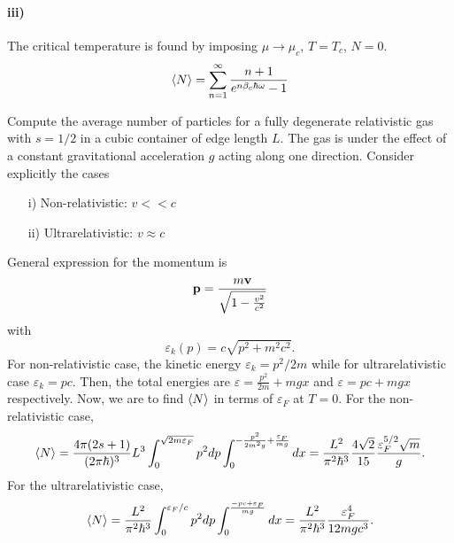             \paragraph{iii)} The critical temperature is found by imposing $\mu\to\mu_c$, $T=T_c$, $N=0$.
            \begin{equation}
                \langle N \rangle = \sum_{n=1}^{\infty}\frac{n+1}{e^{n\beta_c\hbar\omega}-1}
            \end{equation}
\newpage
        \begin{eocproblem*}{}
            Compute the average number of particles for a fully degenerate relativistic gas with $s=1/2$ in a cubic container of edge length $L$. The gas is under the effect of a constant gravitational acceleration $g$ acting along one direction. Consider explicitly the cases
            \begin{enumerate}
                \item[i)] Non-relativistic: $v<<c$
                \item[ii)] Ultrarelativistic: $v\approx c$ 
            \end{enumerate}
        \end{eocproblem*}
            General expression for the momentum is
            \begin{equation}
                \mathbf{p} = \frac{m\mathbf{v}}{\sqrt{1-\frac{v^2}{c^2}}}
            \end{equation}
            with
            \begin{equation}
                \varepsilon_k(p) = c\sqrt{p^2+m^2c^2}.
            \end{equation}
            For non-relativistic case, the kinetic energy $\varepsilon_k = p^2/2m$ while for ultrarelativistic case $\varepsilon_k=pc$. Then, the total energies are $\varepsilon = \frac{p^2}{2m}+mgx$ and $\varepsilon=pc+mgx$ respectively. Now, we are to find $\langle N \rangle$ in terms of $\varepsilon_F$ at $T=0$. For the non-relativistic case,
            \begin{equation}
                \langle N \rangle = \frac{4\pi(2s+1)}{(2\pi\hbar)^3}L^3\int_{0}^{\sqrt{2m\varepsilon_F}}p^2dp\int_{0}^{-\frac{p^2}{2m^2g}+\frac{\varepsilon_F}{mg}}dx = \frac{L^2}{\pi^2\hbar^3}\frac{4\sqrt{2}}{15}\frac{\varepsilon_F^{5/2}\sqrt{m}}{g}.
            \end{equation}
            For the ultrarelativistic case,
            \begin{equation}
                \langle N \rangle = \frac{L^2}{\pi^2\hbar^3}\int_{0}^{\varepsilon_F/c}p^2dp\int_{0}^{\frac{-pc+\varepsilon_F}{mg}}dx=\frac{L^2}{\pi^2\hbar^3}\frac{\varepsilon_F^4}{12mgc^3}.
            \end{equation}
